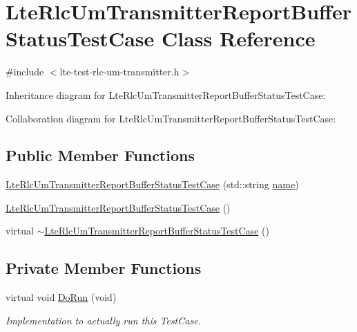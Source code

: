 \hypertarget{classLteRlcUmTransmitterReportBufferStatusTestCase}{}\section{Lte\+Rlc\+Um\+Transmitter\+Report\+Buffer\+Status\+Test\+Case Class Reference}
\label{classLteRlcUmTransmitterReportBufferStatusTestCase}


{\ttfamily \#include $<$lte-\/test-\/rlc-\/um-\/transmitter.\+h$>$}



Inheritance diagram for Lte\+Rlc\+Um\+Transmitter\+Report\+Buffer\+Status\+Test\+Case\+:


Collaboration diagram for Lte\+Rlc\+Um\+Transmitter\+Report\+Buffer\+Status\+Test\+Case\+:
\subsection*{Public Member Functions}
\begin{DoxyCompactItemize}
\item 
\hyperlink{classLteRlcUmTransmitterReportBufferStatusTestCase_a86c15bd03d9dc9d3e29d4deaf988b9a9}{Lte\+Rlc\+Um\+Transmitter\+Report\+Buffer\+Status\+Test\+Case} (std\+::string \hyperlink{generate__test__data__lte__spectrum__model_8m_ab74e6bf80237ddc4109968cedc58c151}{name})
\item 
\hyperlink{classLteRlcUmTransmitterReportBufferStatusTestCase_a4bf5ee081233b94af8cac12a88a6d2fe}{Lte\+Rlc\+Um\+Transmitter\+Report\+Buffer\+Status\+Test\+Case} ()
\item 
virtual \hyperlink{classLteRlcUmTransmitterReportBufferStatusTestCase_a880593c8db1f8f9701db79fa4a00806a}{$\sim$\+Lte\+Rlc\+Um\+Transmitter\+Report\+Buffer\+Status\+Test\+Case} ()
\end{DoxyCompactItemize}
\subsection*{Private Member Functions}
\begin{DoxyCompactItemize}
\item 
virtual void \hyperlink{classLteRlcUmTransmitterReportBufferStatusTestCase_a5aecdc76e34d93f2746ae95dd5072fe1}{Do\+Run} (void)
\begin{DoxyCompactList}\small\item\em Implementation to actually run this Test\+Case. \end{DoxyCompactList}\end{DoxyCompactItemize}
